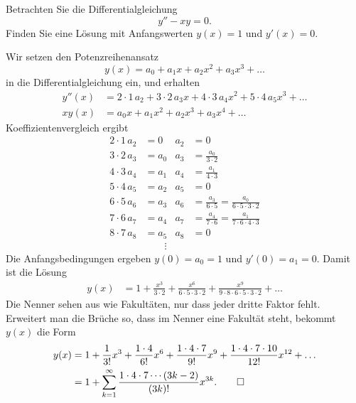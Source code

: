 Betrachten Sie die Differentialgleichung
\[
y'' - xy = 0.
\]
Finden Sie eine Lösung mit Anfangswerten $y(x)=1$ und $y'(x)=0$.

\begin{loesung}
Wir setzen den Potenzreihenansatz
\[
y(x) = a_0 + a_1x + a_2x^2 + a_3x^3+\dots
\]
in die Differentialgleichung ein, und erhalten
\begin{align*}
y''(x)
&=
2\cdot 1\, a_2 + 3\cdot 2\, a_3x + 4\cdot 3\, a_4x^2 + 5\cdot 4\,a_5x^3+\dots
\\
xy(x)
&=
a_0x + a_1x^2 + a_2x^3+a_3x^4+\dots
\end{align*}
Koeffizientenvergleich ergibt
\begin{align*}
2\cdot 1\,a_2 &= 0    &a_2&=0\\
3\cdot 2\,a_3 &= a_0  &a_3&=\frac{a_0}{3\cdot 2}\\
4\cdot 3\,a_4 &= a_1  &a_4&=\frac{a_1}{4\cdot 3}\\
5\cdot 4\,a_5 &= a_2  &a_5&=0\\
6\cdot 5\,a_6 &= a_3  &a_6&=\frac{a_3}{6\cdot 5}=\frac{a_0}{6\cdot 5\cdot 3\cdot 2}\\
7\cdot 6\,a_7 &= a_4  &a_7&=\frac{a_4}{7\cdot 6}=\frac{a_1}{7\cdot 6\cdot 4\cdot 3}\\
8\cdot 7\,a_8 &= a_5  &a_8&=0\\
              &\qquad\vdots
\end{align*}
Die Anfangsbedingungen ergeben $y(0)=a_0=1$ und $y'(0)=a_1=0$.
Damit ist die Lösung
\begin{align*}
y(x)
&=
1
+ \frac{x^3}{3\cdot 2}
+ \frac{x^6}{6\cdot 5\cdot 3\cdot 2}
+ \frac{x^9}{9\cdot 8\cdot 6\cdot 5\cdot 3\cdot 2}
+ \dots
\end{align*}
Die Nenner sehen aus wie Fakultäten, nur dass jeder dritte Faktor fehlt.
Erweitert man die Brüche so, dass im Nenner eine Fakultät steht, bekommt
$y(x)$ die Form
\begin{align*}
y(x)
&=
1
+ \frac{1}{3!}x^3
+ \frac{1\cdot 4}{6!}x^6
+ \frac{1\cdot 4\cdot 7}{9!}x^9
+ \frac{1\cdot 4\cdot 7\cdot 10}{12!}x^{12}
+ \dots
\\
&=
1 + \sum_{k=1}^\infty \frac{1\cdot 4\cdot 7\cdots (3k-2)}{(3k)!} x^{3k}.
\qedhere
\end{align*}
\end{loesung}

